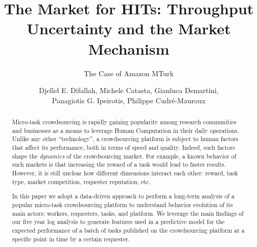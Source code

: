 \documentclass{sig-alternate}
\begin{document}
%

\title{The Market for HITs: Throughput Uncertainty and the Market Mechanism}
\subtitle{The Case of Amazon MTurk}


\author{Djellel E. Difallah, Michele Catasta, Gianluca Demartini, \\ Panagiotis G. Ipeirotis, Philippe Cudr\'e-Mauroux}

\maketitle
\begin{abstract}
Micro-task crowdsourcing is rapidly gaining popularity among research communities and businesses as a means to leverage Human Computation in their daily operations. Unlike any other ``technology'', a crowdsourcing platform is subject to human factors that affect its performance, both in terms of speed and quality. Indeed, such factors shape the \emph{dynamics} of the crowdsourcing market. For example, a known behavior of such markets is that increasing the reward of a task would lead to faster results. However, it is still unclear how different dimensions interact each other: reward, task type, market competition, requester reputation, etc.

In this paper we adopt a data-driven approach to perform a long-term analysis of a popular micro-task crowdsourcing platform to understand behavior evolution of its main actors: workers, requesters, tasks, and platform. We leverage the main findings of our five year log analysis to generate features used in a predictive model for the expected performance of a batch of tasks published on the crowdsourcing platform at a specific point in time by a certain requester.
\end{abstract}
\end{document}
